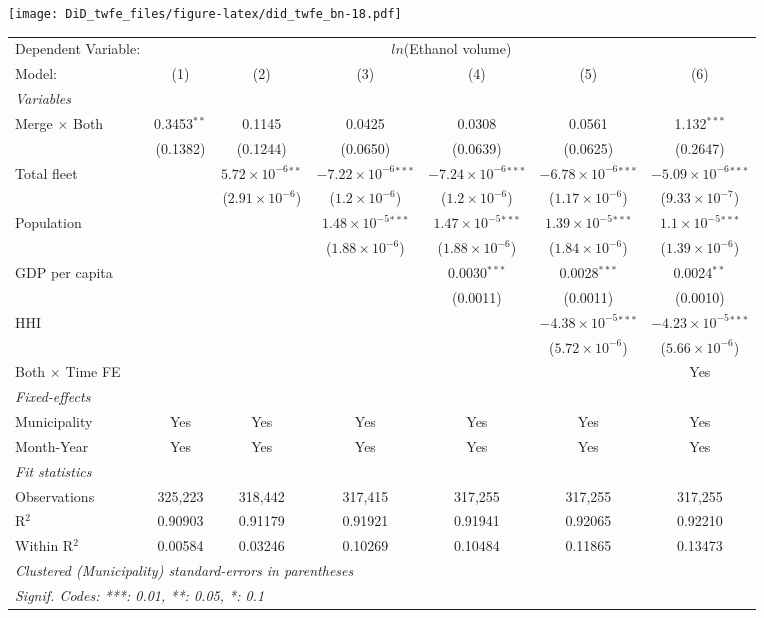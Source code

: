 \documentclass[
]{article}
\begin{document}
\texttt{[image: DiD\_twfe\_files/figure-latex/did\_twfe\_bn-18.pdf]}

\begin{tabular}{lcccccc}
\tabularnewline\midrule\midrule
Dependent Variable:&\multicolumn{6}{c}{$ln$(Ethanol volume)}\\
Model:&(1) & (2) & (3) & (4) & (5) & (6)\\
\midrule \emph{Variables}&   &   &   &   &   &  \\
Merge $\times $ Both & 0.3453$^{**}$ & 0.1145 & 0.0425 & 0.0308 & 0.0561 & 1.132$^{***}$\\
  &(0.1382) & (0.1244) & (0.0650) & (0.0639) & (0.0625) & (0.2647)\\
Total fleet &    & $5.72\times 10^{-6}$$^{**}$ & $-7.22\times 10^{-6}$$^{***}$ & $-7.24\times 10^{-6}$$^{***}$ & $-6.78\times 10^{-6}$$^{***}$ & $-5.09\times 10^{-6}$$^{***}$\\
  &   & ($2.91\times 10^{-6}$) & ($1.2\times 10^{-6}$) & ($1.2\times 10^{-6}$) & ($1.17\times 10^{-6}$) & ($9.33\times 10^{-7}$)\\
Population &    &    & $1.48\times 10^{-5}$$^{***}$ & $1.47\times 10^{-5}$$^{***}$ & $1.39\times 10^{-5}$$^{***}$ & $1.1\times 10^{-5}$$^{***}$\\
  &   &    & ($1.88\times 10^{-6}$) & ($1.88\times 10^{-6}$) & ($1.84\times 10^{-6}$) & ($1.39\times 10^{-6}$)\\
GDP per capita &    &    &    & 0.0030$^{***}$ & 0.0028$^{***}$ & 0.0024$^{**}$\\
  &   &    &    & (0.0011) & (0.0011) & (0.0010)\\
HHI &    &    &    &    & $-4.38\times 10^{-5}$$^{***}$ & $-4.23\times 10^{-5}$$^{***}$\\
  &   &    &    &    & ($5.72\times 10^{-6}$) & ($5.66\times 10^{-6}$)\\
Both $\times$ Time FE &  &  &  &  &  & Yes\\
\midrule \emph{Fixed-effects}&   &   &   &   &   &  \\
Municipality & Yes & Yes & Yes & Yes & Yes & Yes\\
Month-Year & Yes & Yes & Yes & Yes & Yes & Yes\\
\midrule \emph{Fit statistics}&  & & & & & \\
Observations & 325,223&318,442&317,415&317,255&317,255&317,255\\
R$^2$ & 0.90903&0.91179&0.91921&0.91941&0.92065&0.92210\\
Within R$^2$ & 0.00584&0.03246&0.10269&0.10484&0.11865&0.13473\\
\midrule\midrule\multicolumn{7}{l}{\emph{Clustered (Municipality) standard-errors in parentheses}}\\
\multicolumn{7}{l}{\emph{Signif. Codes: ***: 0.01, **: 0.05, *: 0.1}}\\
\end{tabular}
\end{document}
